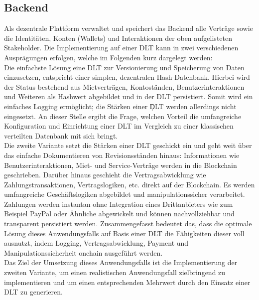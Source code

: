 \subsection{Backend}
\label{subsec:iot_usecase:solution:backend}
Als dezentrale Plattform verwaltet und speichert das Backend alle Verträge sowie die Identitäten, Konten (Wallets) und Interaktionen der oben aufgelisteten Stakeholder. Die Implementierung auf einer \ac{DLT} kann in zwei verschiedenen Ausprägungen erfolgen, welche im Folgenden kurz dargelegt werden:\\
Die einfachste Lösung eine \ac{DLT} zur Versionierung und Speicherung von Daten einzusetzen, entspricht einer simplen, dezentralen Hash-Datenbank. Hierbei wird der Status bestehend aus Mietverträgen, Kontoständen, Benutzerinteraktionen und Weiteren als Hashwert abgebildet und in der \ac{DLT} persistiert. Somit wird ein einfaches Logging ermöglicht; die Stärken einer \c{DLT} werden allerdings nicht eingesetzt. An dieser Stelle ergibt die Frage, welchen Vorteil die umfangreiche Konfiguration und Einrichtung einer \ac{DLT} im Vergleich zu einer klassischen verteilten Datenbank mit sich bringt.\\
Die zweite Variante setzt die Stärken einer \ac{DLT} geschickt ein und geht weit über das einfache Dokumentieren von Revisionsständen hinaus: Informationen wie Benutzerinteraktionen, Miet- und Service-Verträge werden in die Blockchain geschrieben. Darüber hinaus geschieht die Vertragsabwicklung wie Zahlungstransaktionen, Vertragslogiken, etc. direkt auf der Blockchain. Es werden umfangreiche Geschäftslogiken abgebildet und manipulationssicher verarbeitet. Zahlungen werden instantan ohne Integration eines Drittanbieters wie zum Beispiel PayPal oder Ähnliche abgewickelt und können nachvollziehbar und transparent persistiert werden. Zusammengefasst bedeutet das, dass die optimale Lösung dieses Anwendungsfalls auf Basis einer \ac{DLT} die Fähigkeiten dieser voll ausnutzt, indem Logging, Vertragsabwicklung, Payment und Manipulationssicherheit onchain ausgeführt werden.\\
Das Ziel der Umsetzung dieses Anwendungsfalls ist die Implementierung der zweiten Variante, um einen realistischen Anwendungsfall zielbringend zu implementieren und um einen entsprechenden Mehrwert durch den Einsatz einer \ac{DLT} zu generieren.
